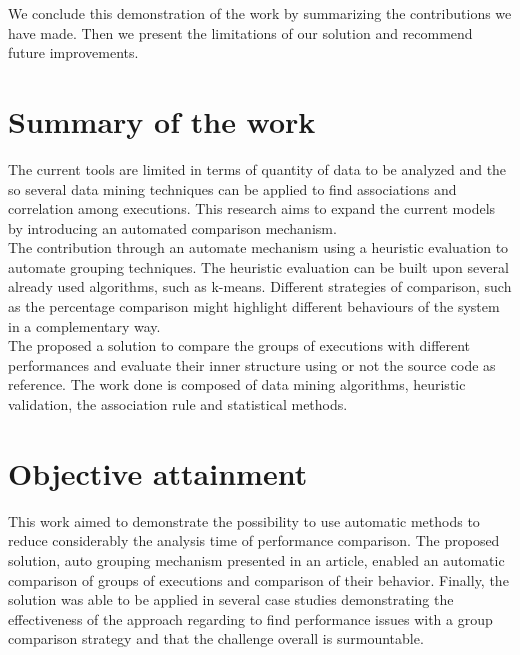 \label{sec:Conclusion}
We conclude this demonstration of the work by summarizing the contributions we have made. Then we present the limitations of our solution and recommend future improvements.

\section{Summary of the work}
The current tools are limited in terms of quantity of data to be analyzed and the so several data mining techniques can be applied to find associations and correlation among executions. This research aims to expand the current models by introducing an automated comparison mechanism. \\
The contribution through an automate mechanism using a heuristic evaluation to automate grouping techniques. The heuristic evaluation can be built upon several already used algorithms, such as k-means. Different strategies of comparison, such as the percentage comparison might highlight different behaviours of the system in a complementary way.\\
The proposed a solution to compare the groups of executions with different performances and evaluate their inner structure using or not the source code as reference. The work done is composed of data mining algorithms,  heuristic validation, the association rule and statistical methods.


\section{Objective attainment}\label{sec:Limitations}
This work aimed to demonstrate the possibility to use automatic methods to reduce considerably the analysis time of performance comparison. The proposed solution, auto grouping mechanism presented in an article, enabled an automatic comparison of groups of executions and comparison of their behavior. Finally, the solution was able to be applied in several case studies demonstrating the effectiveness of the approach regarding to find performance issues with a group comparison strategy and that the challenge overall is surmountable.\\
